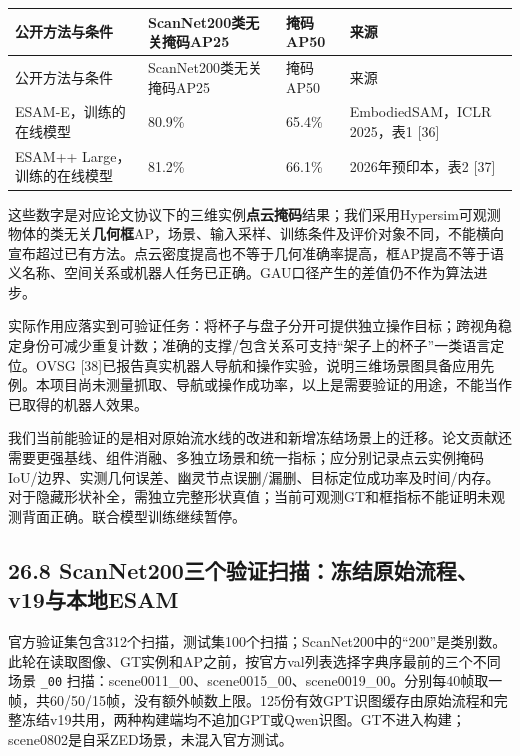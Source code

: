 \documentclass[UTF8,fontset=fandol]{ctexart}
\begin{document}
{\small
\begin{longtable}{|p{}|p{}|p{}|p{}|}
\hline
公开方法与条件 & ScanNet200类无关掩码AP25 & 掩码AP50 & 来源 \\ \hline
\endfirsthead
\hline
公开方法与条件 & ScanNet200类无关掩码AP25 & 掩码AP50 & 来源 \\ \hline
\endhead
ESAM-E，训练的在线模型 & 80.9\% & 65.4\% & EmbodiedSAM，ICLR 2025，表1 [36] \\ \hline
ESAM++ Large，训练的在线模型 & 81.2\% & 66.1\% & 2026年预印本，表2 [37] \\ \hline
\end{longtable}
}

这些数字是对应论文协议下的三维实例\textbf{点云掩码}结果；我们采用Hypersim可观测物体的类无关\textbf{几何框}AP，场景、输入采样、训练条件及评价对象不同，不能横向宣布超过已有方法。点云密度提高也不等于几何准确率提高，框AP提高不等于语义名称、空间关系或机器人任务已正确。GAU口径产生的差值仍不作为算法进步。



实际作用应落实到可验证任务：将杯子与盘子分开可提供独立操作目标；跨视角稳定身份可减少重复计数；准确的支撑/包含关系可支持“架子上的杯子”一类语言定位。OVSG [38]已报告真实机器人导航和操作实验，说明三维场景图具备应用先例。本项目尚未测量抓取、导航或操作成功率，以上是需要验证的用途，不能当作已取得的机器人效果。



我们当前能验证的是相对原始流水线的改进和新增冻结场景上的迁移。论文贡献还需要更强基线、组件消融、多独立场景和统一指标；应分别记录点云实例掩码IoU/边界、实测几何误差、幽灵节点误删/漏删、目标定位成功率及时间/内存。对于隐藏形状补全，需独立完整形状真值；当前可观测GT和框指标不能证明未观测背面正确。联合模型训练继续暂停。



\subsection*{26.8 ScanNet200三个验证扫描：冻结原始流程、v19与本地ESAM}

官方验证集包含312个扫描，测试集100个扫描；ScanNet200中的“200”是类别数。此轮在读取图像、GT实例和AP之前，按官方val列表选择字典序最前的三个不同场景 \texttt{\_\allowbreak{}00} 扫描：scene0011\_00、scene0015\_00、scene0019\_00。分别每40帧取一帧，共60/50/15帧，没有额外帧数上限。125份有效GPT识图缓存由原始流程和完整冻结v19共用，两种构建端均不追加GPT或Qwen识图。GT不进入构建；scene0802是自采ZED场景，未混入官方测试。
\end{document}

